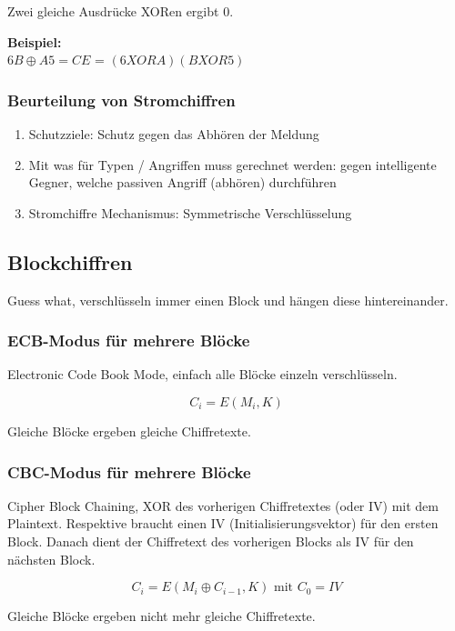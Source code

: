 \documentclass[12pt]{scrartcl}
\begin{document}
Zwei gleiche Ausdrücke XORen ergibt 0.

\textbf{Beispiel:}  \\
$6B \oplus A5 = CE$ = $(6 XOR A)(B XOR 5)$


\subsubsection{Beurteilung von Stromchiffren}

\begin{enumerate}
    \item Schutzziele: Schutz gegen das Abhören der Meldung
    \item Mit was für Typen / Angriffen muss gerechnet werden: gegen intelligente Gegner, welche 
    passiven Angriff (abhören) durchführen
    \item Stromchiffre Mechanismus: Symmetrische Verschlüsselung
\end{enumerate}


\subsection{Blockchiffren}

Guess what, verschlüsseln immer einen Block und hängen diese hintereinander.


\subsubsection{ECB-Modus für mehrere Blöcke}

Electronic Code Book Mode, einfach alle Blöcke einzeln verschlüsseln.

$$C_i = E(M_i,K)$$

Gleiche Blöcke ergeben gleiche Chiffretexte.


\subsubsection{CBC-Modus für mehrere Blöcke}

Cipher Block Chaining, XOR des vorherigen Chiffretextes (oder IV) mit dem Plaintext.
Respektive braucht einen IV (Initialisierungsvektor) für den ersten Block. Danach dient
der Chiffretext des vorherigen Blocks als IV für den nächsten Block.

$$C_i = E(M_i \oplus C_{i-1}, K) \text{ mit } C_0 = IV$$


Gleiche Blöcke ergeben nicht mehr gleiche Chiffretexte.\\
\end{document}
